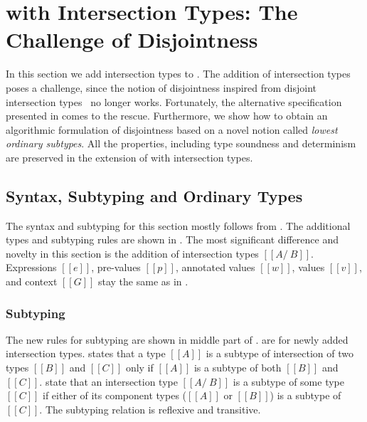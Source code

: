 \section{\cal with Intersection Types: The Challenge of Disjointness}
\label{sec:inter}

In this section we add intersection types to \cal.
The addition of intersection types poses a challenge,
since the notion of disjointness inspired from disjoint intersection types~\citep{oliveira2016disjoint}
no longer works. Fortunately, the alternative specification presented in
 comes to the rescue. Furthermore, we show how to obtain
an algorithmic formulation of disjointness based on a novel notion
called \emph{lowest ordinary subtypes}. All the properties, including
type soundness and determinism are preserved in the extension of \cal
with intersection types.

\subsection{Syntax, Subtyping and Ordinary Types}
\label{sec:inter:system}
The syntax and subtyping for this section mostly follows
from .  The additional types and subtyping rules are shown in
.
The most significant difference and novelty in this section
is the addition of intersection types $[[A/\ B]]$.
Expressions $[[e]]$, pre-values $[[p]]$, annotated values $[[w]]$,
values $[[v]]$, and context $[[G]]$ stay the same as in .

\subsubsection*{Subtyping}
The new rules for subtyping are shown in middle part of
.   are for newly
added intersection types.  states that a type $[[A]]$ is
a subtype of intersection of two types $[[B]]$ and $[[C]]$ only if
$[[A]]$ is a subtype of both $[[B]]$ and $[[C]]$.  
state that an intersection type $[[A /\ B]]$ is a subtype
of some type $[[C]]$ if either of its component types ($[[A]]$ or
$[[B]]$) is a subtype of $[[C]]$. The subtyping relation is reflexive
and transitive.

